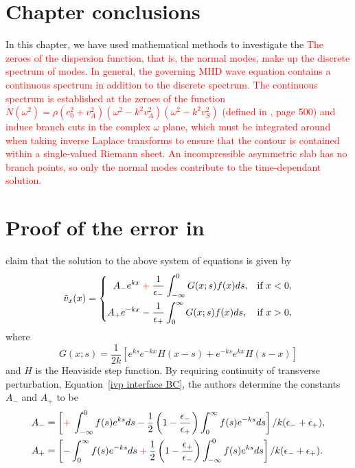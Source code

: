 \documentclass[12pt]{../style-files/ociamthesis}
\begin{document}
\section{Chapter conclusions}
In this chapter, we have used mathematical methods to investigate the 
\textcolor{red}{
	The zeroes of the dispersion function, that is, the normal modes, make up the discrete spectrum of modes. In general, the governing MHD wave equation contains a continuous spectrum in addition to the discrete spectrum. The continuous spectrum is established at the zeroes of the function $N(\omega^2) = \rho (c_0^2 + v_A^2)(\omega^2 - k^2v_A^2)(\omega^2 - k^2v_S^2)$ (defined in \cite{goe_etal04}, page 500) and induce branch cuts in the complex $\omega$ plane, which must be integrated around when taking inverse Laplace transforms to ensure that the contour is contained within a single-valued Riemann sheet. An incompressible asymmetric slab has no branch points, so only the normal modes contribute to the time-dependant solution.}


\appendix

\section{Proof of the error in \cite{rae_etal81}}

\cite{rae_etal81} claim that the solution to the above system of equations is given by 
\begin{equation}
\tilde{v}_x(x) = \left\{
\begin{aligned}
A_-e^{kx}  \: \textcolor{red}{+} \: \frac{1}{\epsilon_-} & \int_{-\infty}^{0} G(x;s)f(x)ds, & \text{if  } x<0,\\
A_+e^{-kx} - \frac{1}{\epsilon_+} & \int_{0}^{\infty} G(x;s)f(x)ds, & \text{if  } x>0,
\end{aligned}
\right.
\label{ivp interface sol}
\end{equation}
where
\begin{equation}
G(x;s) = \frac{1}{2k}[e^{ks}e^{-kx}H(x-s) + e^{-ks}e^{kx}H(s-x)]
\end{equation}
and $H$ is the Heaviside step function. By requiring continuity of transverse perturbation, Equation~\eqref{ivp interface BC}, the authors determine the constants $A_-$ and $A_+$ to be
\begin{align}
A_- & = \left[\textcolor{red}{+} \: \int_{-\infty}^0 f(s)e^{ks} ds - \frac{1}{2}\left(1 - \frac{\epsilon_-}{\epsilon_+}\right)\int_0^\infty f(s)e^{-ks} ds\right] / k(\epsilon_- + \epsilon_+), \\
A_+ & = \left[-\int_0^\infty f(s)e^{-ks} ds \: \textcolor{red}{+} \: \frac{1}{2}\left(1 - \frac{\epsilon_+}{\epsilon_-}\right)\int_{-\infty}^0 f(s)e^{ks} ds\right] / k(\epsilon_- + \epsilon_+).
\label{ivp interface constants}
\end{align}
\end{document}
